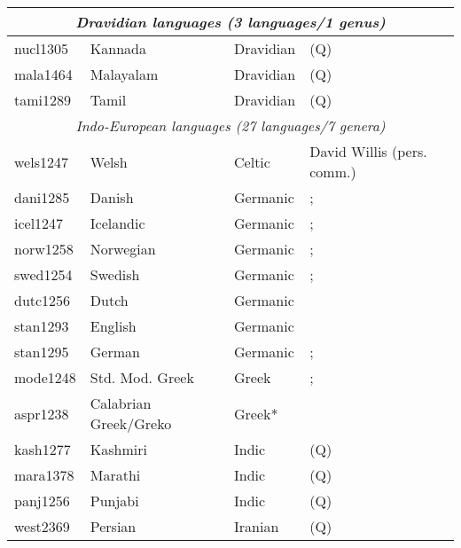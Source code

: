 \documentclass[A4paper]{article}
\begin{document}
\begin{longtable}{p{.11\linewidth}p{.2\linewidth}p{.24\linewidth}p{.35\linewidth}}
\midrule
\multicolumn{4}{c}{{\emph{Dravidian languages (3 languages/1 genus)}}}\\
\midrule
nucl1305	& Kannada 	& Dravidian & (Q) \citealp[205, 208f.]{sridhar1990}\\
mala1464	& Malayalam 	& Dravidian & (Q) \citealp[262f.]{asherkumari1997}\\
tami1289	& Tamil 	& Dravidian & (Q) \citealp[142, 146]{asher1985}\\
\midrule
\multicolumn{4}{c}{{\emph{Indo-European languages (27 languages/7 genera)}}}\\
\midrule
wels1247	& Welsh 		& Celtic & David Willis (pers. comm.) \\
dani1285	& Danish 		& Germanic & \citealt{johannessen2008}; \citealt{schroeter2021}\\
icel1247	& Icelandic 		& Germanic & \citealp{johannessen2008}; \citealt[11f.]{sigurdssonwood2020}\\
norw1258	& Norwegian 		& Germanic & \citealp[127, 129]{julien2005}; \citealp{johannessen2008}\\
swed1254	& Swedish 		& Germanic & \citealp[128]{julien2005}; \citealp{johannessen2008}\\
dutc1256	& Dutch 		& Germanic & \citealt[52]{corver2008vocative}\\
stan1293	& English 		& Germanic & \citealp{postal1969, delormedougherty1972, sommerstein1972, pesetsky1978, keizer2016}\\
stan1295	& German 		& Germanic & \citealp[ch. 6]{lawrenz1993}; \citealp{rauh2003, rauh2004, roehrs2005}\\
mode1248	& Std. Mod. Greek 	& Greek & \citealp[chs. 1/2]{choi2014phd}; \citealp[sec. 5]{hoehn2015unagr}\\
aspr1238	& Calabrian Greek/Greko	& Greek* &  \citealp[274]{hoehnetalICGLcalabria}\\
kash1277	& Kashmiri 		& Indic & (Q) \citealp[200]{walikoul1997}\\
mara1378	& Marathi 		& Indic  & (Q) \citealp[386]{pandharipande1997}\\
panj1256	& Punjabi 		& Indic & (Q) \citealp[228]{bhatia1993}\\
west2369	& Persian 		& Iranian & (Q) \citealp[209, 212]{mahootian1997}\\

\end{longtable}
\end{document}
